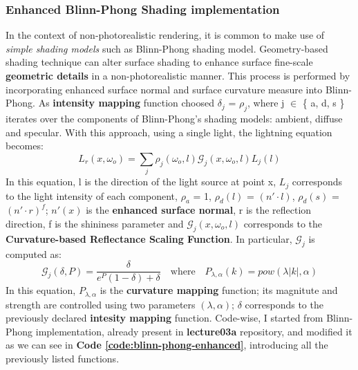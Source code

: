\subsubsection{Enhanced Blinn-Phong Shading implementation}
In the context of non-photorealistic rendering, it is common to make use of \textit{simple shading models} such as Blinn-Phong shading model. \newline
Geometry-based shading technique can alter surface shading to enhance surface fine-scale \textbf{geometric details} in a non-photorealistic manner. This process is performed by incorporating enhanced surface normal and surface curvature measure into Blinn-Phong.
\newline
As \textbf{intensity mapping} function \cite{referencePaper} choosed $\delta_j$ = $\rho_j$, where j $\in$ \{ a, d, s \} iterates over the components of Blinn-Phong's shading models: ambient, diffuse and specular. \newline
With this approach, using a single light, the lightning equation becomes:
\begin{equation}
	L_r(x,\omega_o) = \sum_j \rho_j(\omega_o,l) \mathcal{G}_j(x,\omega_o,l) L_j(l)
\end{equation}
In this equation, l is the direction of the light source at point x, $L_j$ corresponds to the light intensity of each component, $\rho_a$ = 1, $\rho_d(l)$ = $(n'\cdot  l)$, $\rho_d(s)$ = $(n'\cdot  r)^f$; \newline
$n'(x)$ is the \textbf{enhanced surface normal}, r is the reflection direction, f is the shininess parameter and $\mathcal{G}_j(x,\omega_o,l)$ corresponds to the \textbf{Curvature-based Reflectance Scaling Function}. \newline
In particular, $\mathcal{G}_j$ is computed as:
\begin{equation}
	\mathcal{G}_j(\delta, P) = \frac{\delta}{e^P (1-\delta) + \delta}\quad\mathrm{where}\quad  P_{\lambda,\alpha}(k) = pow(\lambda |k|, \alpha)
\end{equation}
In this equation, $P_{\lambda,\alpha}$ is the \textbf{curvature mapping} function; its magnitute and strength are controlled using two parameters $(\lambda,\alpha)$; $\delta$ corresponds to the previously declared \textbf{intesity mapping} function.\newline
Code-wise, I started from Blinn-Phong implementation, already present in \textbf{lecture03a} repository, and modified it as we can see in \textbf{Code \ref{code:blinn-phong-enhanced}}, introducing all the previously listed functions. \newline
